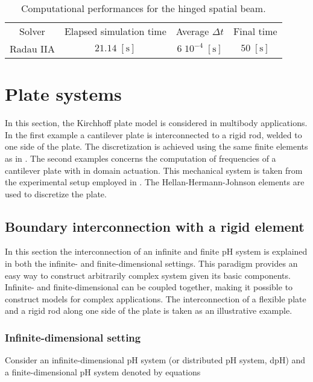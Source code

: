 \begin{table}[tb]
	\centering
	\caption{Computational performances for the hinged spatial beam.}
	\label{tab:comp_perf_hinged}       %
	\begin{tabular}{cccc}
		\hline\noalign{\smallskip}
		Solver & Elapsed simulation time & Average $\Delta t$ &  Final time \\
		\noalign{\smallskip}\hline\noalign{\smallskip}
		Radau IIA & $21.14\; \mathrm{[s]}$ & $6 \; 10^{-4} \; \mathrm{[s]}$ & $50 \; \mathrm{[s]}$ \\
		\hline
	\end{tabular}
\end{table}


\section{Plate systems}
In this section, the Kirchhoff plate model is considered in multibody applications. In the first example a cantilever plate is interconnected to a rigid rod, welded to one side of the plate. The discretization is achieved using the same finite elements as in . The second examples concerns the computation of frequencies of a cantilever plate with in domain actuation. This mechanical system is taken from the experimental setup employed in \cite{preda2020}. The Hellan-Hermann-Johnson elements are used to discretize the plate.

\subsection{Boundary interconnection with a rigid element}
In this section the interconnection of an infinite and finite pH system is explained in both the infinite- and finite-dimensional settings. This paradigm provides an easy way to construct arbitrarily complex system given its basic components. Infinite- and finite-dimensional can be coupled together, making it possible to construct models for complex applications. The interconnection of a flexible plate and a rigid rod along one side of the plate is taken as an illustrative example.

\subsubsection{Infinite-dimensional setting}
Consider an infinite-dimensional pH system (or distributed pH system, dpH) and a finite-dimensional pH system denoted by equations 

